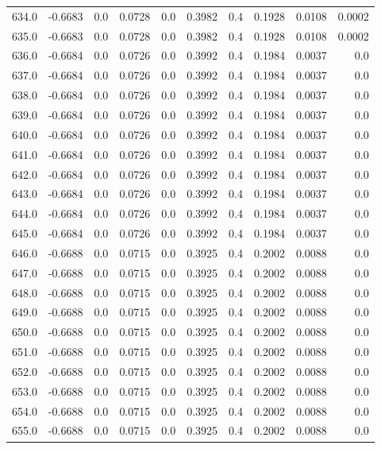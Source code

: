 \begin{longtable}{lrrrrrrrrr}
634.0 & -0.6683 & 0.0 & 0.0728 & 0.0 & 0.3982 & 0.4 & 0.1928 & 0.0108 & 0.0002 \\
635.0 & -0.6683 & 0.0 & 0.0728 & 0.0 & 0.3982 & 0.4 & 0.1928 & 0.0108 & 0.0002 \\
636.0 & -0.6684 & 0.0 & 0.0726 & 0.0 & 0.3992 & 0.4 & 0.1984 & 0.0037 & 0.0 \\
637.0 & -0.6684 & 0.0 & 0.0726 & 0.0 & 0.3992 & 0.4 & 0.1984 & 0.0037 & 0.0 \\
638.0 & -0.6684 & 0.0 & 0.0726 & 0.0 & 0.3992 & 0.4 & 0.1984 & 0.0037 & 0.0 \\
639.0 & -0.6684 & 0.0 & 0.0726 & 0.0 & 0.3992 & 0.4 & 0.1984 & 0.0037 & 0.0 \\
640.0 & -0.6684 & 0.0 & 0.0726 & 0.0 & 0.3992 & 0.4 & 0.1984 & 0.0037 & 0.0 \\
641.0 & -0.6684 & 0.0 & 0.0726 & 0.0 & 0.3992 & 0.4 & 0.1984 & 0.0037 & 0.0 \\
642.0 & -0.6684 & 0.0 & 0.0726 & 0.0 & 0.3992 & 0.4 & 0.1984 & 0.0037 & 0.0 \\
643.0 & -0.6684 & 0.0 & 0.0726 & 0.0 & 0.3992 & 0.4 & 0.1984 & 0.0037 & 0.0 \\
644.0 & -0.6684 & 0.0 & 0.0726 & 0.0 & 0.3992 & 0.4 & 0.1984 & 0.0037 & 0.0 \\
645.0 & -0.6684 & 0.0 & 0.0726 & 0.0 & 0.3992 & 0.4 & 0.1984 & 0.0037 & 0.0 \\
646.0 & -0.6688 & 0.0 & 0.0715 & 0.0 & 0.3925 & 0.4 & 0.2002 & 0.0088 & 0.0 \\
647.0 & -0.6688 & 0.0 & 0.0715 & 0.0 & 0.3925 & 0.4 & 0.2002 & 0.0088 & 0.0 \\
648.0 & -0.6688 & 0.0 & 0.0715 & 0.0 & 0.3925 & 0.4 & 0.2002 & 0.0088 & 0.0 \\
649.0 & -0.6688 & 0.0 & 0.0715 & 0.0 & 0.3925 & 0.4 & 0.2002 & 0.0088 & 0.0 \\
650.0 & -0.6688 & 0.0 & 0.0715 & 0.0 & 0.3925 & 0.4 & 0.2002 & 0.0088 & 0.0 \\
651.0 & -0.6688 & 0.0 & 0.0715 & 0.0 & 0.3925 & 0.4 & 0.2002 & 0.0088 & 0.0 \\
652.0 & -0.6688 & 0.0 & 0.0715 & 0.0 & 0.3925 & 0.4 & 0.2002 & 0.0088 & 0.0 \\
653.0 & -0.6688 & 0.0 & 0.0715 & 0.0 & 0.3925 & 0.4 & 0.2002 & 0.0088 & 0.0 \\
654.0 & -0.6688 & 0.0 & 0.0715 & 0.0 & 0.3925 & 0.4 & 0.2002 & 0.0088 & 0.0 \\
655.0 & -0.6688 & 0.0 & 0.0715 & 0.0 & 0.3925 & 0.4 & 0.2002 & 0.0088 & 0.0 \\

\end{longtable}
